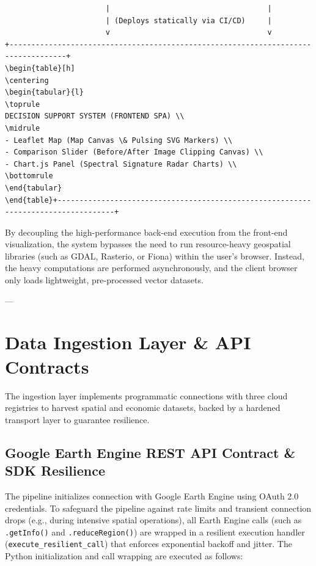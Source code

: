 \begin{verbatim}
                       |                                    |
                       | (Deploys statically via CI/CD)     |
                       v                                    v
+-----------------------------------------------------------------------------------+
\begin{table}[h]
\centering
\begin{tabular}{l}
\toprule
DECISION SUPPORT SYSTEM (FRONTEND SPA) \\
\midrule
- Leaflet Map (Map Canvas \& Pulsing SVG Markers) \\
- Comparison Slider (Before/After Image Clipping Canvas) \\
- Chart.js Panel (Spectral Signature Radar Charts) \\
\bottomrule
\end{tabular}
\end{table}+-----------------------------------------------------------------------------------+
\end{verbatim}

By decoupling the high-performance back-end execution from the front-end visualization, the system bypasses the need to run resource-heavy geospatial libraries (such as GDAL, Rasterio, or Fiona) within the user's browser. Instead, the heavy computations are performed asynchronously, and the client browser only loads lightweight, pre-processed vector datasets.

---

\section{Data Ingestion Layer \& API Contracts}
The ingestion layer implements programmatic connections with three cloud registries to harvest spatial and economic datasets, backed by a hardened transport layer to guarantee resilience.

\subsection{Google Earth Engine REST API Contract \& SDK Resilience}
The pipeline initializes connection with Google Earth Engine using OAuth 2.0 credentials. To safeguard the pipeline against rate limits and transient connection drops (e.g., during intensive spatial operations), all Earth Engine calls (such as \texttt{.getInfo()} and \texttt{.reduceRegion()}) are wrapped in a resilient execution handler (\texttt{execute\_resilient\_call}) that enforces exponential backoff and jitter. The Python initialization and call wrapping are executed as follows:


